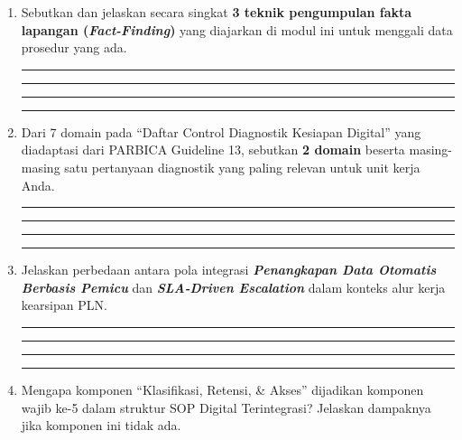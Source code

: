 \documentclass[12pt,a4paper]{report}
\begin{document}
\vspace{0.3cm}

\begin{enumerate}[leftmargin=*, itemsep=0.3cm]

\item Sebutkan dan jelaskan secara singkat \textbf{3 teknik pengumpulan fakta lapangan (\textit{Fact-Finding})} yang diajarkan di modul ini untuk menggali data prosedur yang ada.

\vspace{0.2cm}
\noindent\rule{\textwidth}{0.3pt}
\vspace{0.5cm}
\noindent\rule{\textwidth}{0.3pt}
\vspace{0.5cm}
\noindent\rule{\textwidth}{0.3pt}
\vspace{0.5cm}
\noindent\rule{\textwidth}{0.3pt}

\item Dari 7 domain pada ``Daftar Control Diagnostik Kesiapan Digital'' yang diadaptasi dari PARBICA Guideline 13, sebutkan \textbf{2 domain} beserta masing-masing satu pertanyaan diagnostik yang paling relevan untuk unit kerja Anda.

\vspace{0.2cm}
\noindent\rule{\textwidth}{0.3pt}
\vspace{0.5cm}
\noindent\rule{\textwidth}{0.3pt}
\vspace{0.5cm}
\noindent\rule{\textwidth}{0.3pt}
\vspace{0.5cm}
\noindent\rule{\textwidth}{0.3pt}

\item Jelaskan perbedaan antara pola integrasi \textbf{\textit{Penangkapan Data Otomatis Berbasis Pemicu}} dan \textbf{\textit{SLA-Driven Escalation}} dalam konteks alur kerja kearsipan PLN.

\vspace{0.2cm}
\noindent\rule{\textwidth}{0.3pt}
\vspace{0.5cm}
\noindent\rule{\textwidth}{0.3pt}
\vspace{0.5cm}
\noindent\rule{\textwidth}{0.3pt}
\vspace{0.5cm}
\noindent\rule{\textwidth}{0.3pt}

\item Mengapa komponen ``Klasifikasi, Retensi, \& Akses'' dijadikan komponen wajib ke-5 dalam struktur SOP Digital Terintegrasi? Jelaskan dampaknya jika komponen ini tidak ada.


\end{enumerate}
\end{document}
